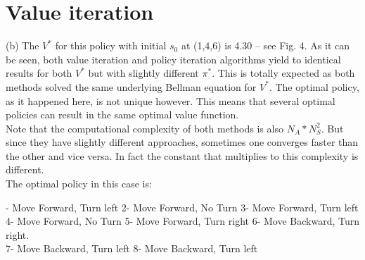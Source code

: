\documentclass{article}
\begin{document}
	\section*{Value iteration}
	
	
	\newpage
	(b) 	
	The $V^*$ for this policy with initial $s_{0}$ at (1,4,6) is 4.30 -- see Fig. 4. As it can be seen, both value iteration and policy iteration algorithms yield to identical results for both $V^*$ but with slightly different $\pi^{*}$. This is totally expected as both methods solved the same underlying Bellman equation for $V^*$. The optimal policy, as it happened here, is not unique however. This means that several optimal policies can result in the same optimal value function.\\
	Note that the computational complexity of both methods is also $N_{A}*N_{S}^2$. But since they have slightly different approaches, sometimes one converges faster than the other and vice versa. In fact the constant that multiplies to this complexity is different. \\
	
	\noindent The optimal policy in this case is:
	
	- Move Forward, Turn left   \hspace{20pt}    2- Move Forward, No Turn \hspace{20pt}    3- Move Forward, Turn left \\ 
	4- Move Forward, No Turn  \hspace{20pt}    5- Move Forward, Turn right \hspace{20pt}    6- Move Backward, Turn right. \\
	7- Move Backward, Turn left  \hspace{20pt}  8- Move Backward, Turn left
	
\end{document}
